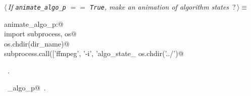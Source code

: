 \documentclass[11.5pt]{report}
\begin{document}
\begin{flushleft} \small\label{scrap29}\raggedright\small
{} $\langle\,${\itshape If \verb|animate_algo_p| $==$ \verb|True|, make an animation of algorithm states}\nobreak\ {\footnotesize {?}}$\,\rangle\equiv$
\vspace{-1ex}
\begin{list}{}{} \item
\mbox{}\verb@if animate_algo_p:@\\
\mbox{}\verb@     import subprocess, os@\\
\mbox{}\verb@     os.chdir(dir_name)@\\
\mbox{}\verb@     subprocess.call(['ffmpeg', '-i', 'algo_state_%05.png', 'insertion_process.mp4'])@\\
\mbox{}\verb@     os.chdir('../')@\\
\mbox{}\verb@@{\NWsep}
\end{list}
\vspace{-1.5ex}
\footnotesize
\begin{list}{}{\setlength{\itemsep}{-\parsep}\setlength{\itemindent}{-\leftmargin}}
\item \NWtxtMacroRefIn\ .
\item \NWtxtIdentsUsed\nobreak\  \verb@animate_algo_p@\nobreak\ .
\item{}
\end{list}
\vspace{4ex}
\end{flushleft}
\newchunk 
\end{document}
